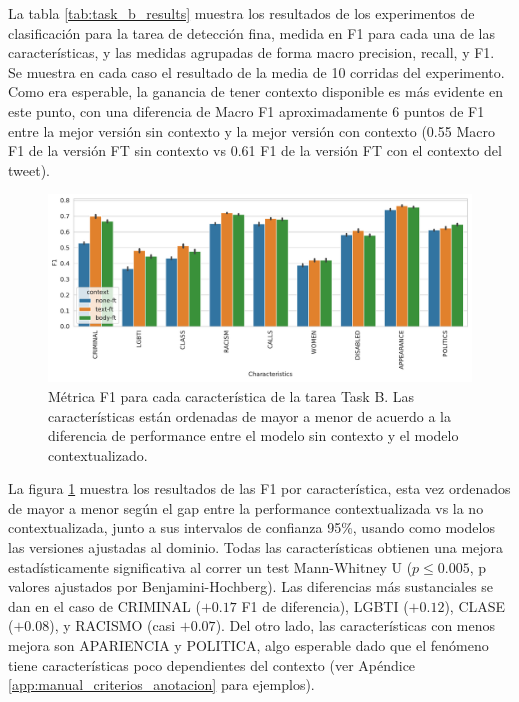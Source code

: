 La tabla \ref{tab:task_b_results} muestra los resultados de los experimentos de clasificación para la tarea de detección fina, medida en F1 para cada una de las características, y las medidas agrupadas de forma macro precision, recall, y F1. Se muestra en cada caso el resultado de la media de 10 corridas del experimento. Como era esperable, la ganancia de tener contexto disponible es más evidente en este punto, con una diferencia de Macro F1 aproximadamente 6 puntos de F1 entre la mejor versión sin contexto y la mejor versión con contexto (0.55 Macro F1 de la versión FT sin contexto vs 0.61 F1 de la versión FT con el contexto del tweet).


\begin{figure}[t]
    \centering
    \includegraphics[width=\textwidth]{img/task_b_scores.pdf}
    \caption{Métrica F1 para cada característica de la tarea Task B. Las características están ordenadas de mayor a menor de acuerdo a la diferencia de performance entre el modelo sin contexto y el modelo contextualizado. }
    \label{fig:barplot_task_b_results}
\end{figure}

La figura \ref{fig:barplot_task_b_results} muestra los resultados de las F1 por característica, esta vez ordenados de mayor a menor según el gap entre la performance contextualizada vs la no contextualizada, junto a sus intervalos de confianza 95\%, usando como modelos las versiones ajustadas al dominio. Todas las características obtienen una mejora estadísticamente significativa al correr un test Mann-Whitney U ($p \leq 0.005$, p valores ajustados por Benjamini-Hochberg\cite{benjamini1995controlling}). Las diferencias más sustanciales se dan en el caso de CRIMINAL ($+0.17$ F1 de diferencia), LGBTI ($+0.12$), CLASE ($+0.08$), y RACISMO (casi $+0.07$). Del otro lado, las características con menos mejora son APARIENCIA y POLITICA, algo esperable dado que el fenómeno tiene características poco dependientes del contexto (ver Apéndice \ref{app:manual_criterios_anotacion} para ejemplos).






